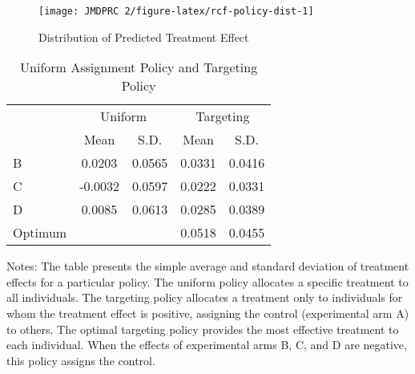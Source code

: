 \documentclass[12pt, a4paper]{article}
\begin{document}
\begin{figure}[t]
\texttt{[image: JMDPRC~2/figure-latex/rcf-policy-dist-1]} \caption{Distribution of Predicted Treatment Effect}\label{fig:rcf-policy-dist}
\end{figure}

\begin{table}

\caption{\label{tab:targeting-effect}Uniform Assignment Policy and Targeting Policy}
\centering
\fontsize{9}{11}\selectfont
\begin{threeparttable}
\begin{tabular}[t]{lcccc}
\toprule
\multicolumn{1}{c}{ } & \multicolumn{2}{c}{Uniform} & \multicolumn{2}{c}{Targeting} \\
\cmidrule(l{3pt}r{3pt}){2-3} \cmidrule(l{3pt}r{3pt}){4-5}
 & Mean & S.D. & Mean & S.D.\\
\midrule
B & 0.0203 & 0.0565 & 0.0331 & 0.0416\\
C & -0.0032 & 0.0597 & 0.0222 & 0.0331\\
D & 0.0085 & 0.0613 & 0.0285 & 0.0389\\
Optimum &  &  & 0.0518 & 0.0455\\
\bottomrule
\end{tabular}
\begin{tablenotes}
\item Notes: The table presents the simple average and standard deviation of treatment effects for a particular policy. The uniform policy allocates a specific treatment to all individuals. The targeting policy allocates a treatment only to individuals for whom the treatment effect is positive, assigning the control (experimental arm A) to others. The optimal targeting policy provides the most effective treatment to each individual. When the effects of experimental arms B, C, and D are negative, this policy assigns the control.
\end{tablenotes}
\end{threeparttable}
\end{table}
\end{document}

